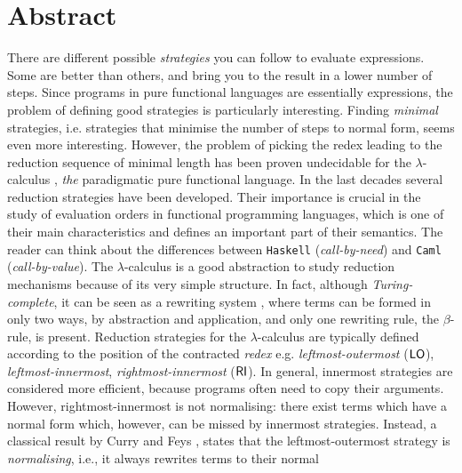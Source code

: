 \begingroup
\let\clearpage\relax
\let\cleardoublepage\relax
\let\cleardoublepage\relax

\chapter*{Abstract}
There are different possible \emph{strategies} you can follow to
evaluate expressions. Some are better than others, and bring you to
the result in a lower number of steps. Since programs in pure
functional languages are essentially expressions, the problem of
defining good strategies is particularly interesting. Finding
\emph{minimal} strategies, i.e. strategies that minimise the number of
steps to normal form, seems even more interesting. However, the problem
of picking the redex leading to the reduction sequence of minimal length
has been proven undecidable for the $\lambda$-calculus
\cite[Section~13.5]{barendregt_lambda_1984}, \emph{the} paradigmatic
pure functional language. In the last decades several reduction
strategies have been developed. Their importance is crucial in the
study of evaluation orders in functional programming languages, which
is one of their main characteristics and defines an important part of
their semantics. The reader can think about the differences between
\texttt{Haskell} (\emph{call-by-need}) and \texttt{Caml}
(\emph{call-by-value}). The $\lambda$-calculus is a good abstraction
to study reduction mechanisms because of its very simple
structure. In fact, although \emph{Turing-complete}, it can be seen as
a rewriting system \cite{terese_term_2003}, where terms can be formed
in only two ways, by abstraction and application, and only one
rewriting rule, the $\beta$-rule, is present. Reduction strategies for
the $\lambda$-calculus are typically defined according to the position
of the contracted \emph{redex} e.g. \emph{leftmost-outermost} ($\textsf{LO}$),
\emph{leftmost-innermost}, \emph{rightmost-innermost} ($\textsf{RI}$).
In general, innermost strategies are considered more efficient, because
programs often need to copy their arguments. However, rightmost-innermost is not normalising: there
exist terms which have a normal form which, however, can be missed by
innermost strategies. Instead, a classical result by Curry and Feys
\cite{curry_combinatory_1958}, states that the leftmost-outermost strategy is
\emph{normalising}, i.e., it always rewrites terms to their normal
